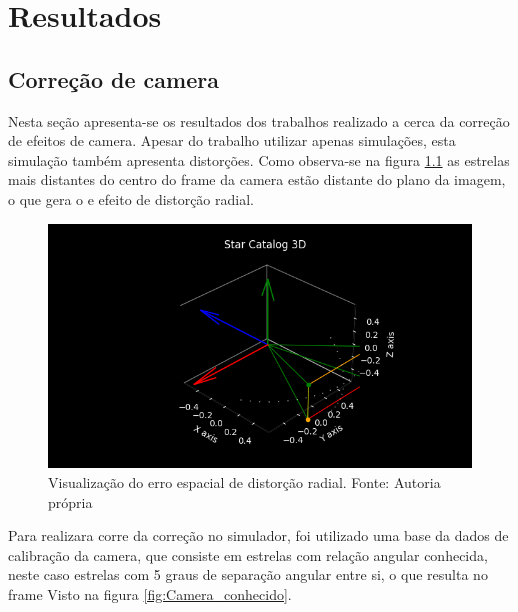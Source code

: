 \chapter{Resultados}
\label{cap:Resultados_init}
\section{Correção de camera}
\label{sec:Resultados_correcao_camera}

Nesta seção apresenta-se os resultados dos trabalhos realizado a cerca da correção de efeitos de camera.
Apesar do trabalho utilizar apenas simulações, esta simulação também apresenta distorções.
Como observa-se na figura \ref{fig:distortion} as estrelas mais distantes do centro do frame da camera estão distante do plano da imagem,
o que gera o e efeito de distorção radial.

\begin{figure}[H]
    \centering
    \includegraphics[width=1\textwidth]{images/distortion.png}
    \caption{Visualização do erro espacial de distorção radial. Fonte: Autoria própria}
    \label{fig:distortion}
\end{figure}

Para realizara corre da correção no simulador, foi utilizado uma base da dados de calibração da camera,
que consiste em estrelas com relação angular conhecida,
neste caso estrelas com 5 graus de separação angular entre si,
o que resulta no frame Visto na figura \ref{fig:Camera_conhecido}.

